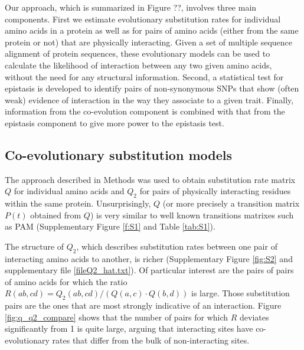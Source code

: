 Our approach, which is summarized in Figure ??, involves three main components. First we estimate evolutionary substitution rates for individual amino acids in a protein as well as for pairs of amino acids (either from the same protein or not) that are physically interacting. Given a set of multiple sequence alignment of protein sequences, these evolutionary models can be used to calculate the likelihood of interaction between any two given amino acids, without the need for any structural information. Second, a statistical test for epistasis is developed to identify pairs of non-synonymous SNPs that show (often weak) evidence of interaction in the way they associate to a given trait. Finally, information from the co-evolution component is combined with that from the epistasis component to give more power to the epistasis test.
 
\subsection{Co-evolutionary substitution models}

The approach described in Methods was used to obtain substitution rate matrix $Q$ for individual amino acids and $Q_2$ for pairs of physically interacting residues within the same protein. Unsurprisingly, $Q$ (or more precisely a transition matrix $P(t)$ obtained from $Q$) is very similar to well known transitions matrixes such as PAM \cite{dayhoff1978model} (Supplementary Figure \ref{f:S1} and Table \ref{tab:S1}).


The structure of $Q_2$, which describes substitution rates between one pair of interacting amino acids to another, is richer (Supplementary Figure \ref{fig:S2} and supplementary file \ref{fileQ2_hat.txt}). Of particular interest are the pairs of pairs of amino acids for which the ratio $R(ab,cd) = Q_2 (ab, cd) / ( Q(a,c) \cdot Q(b,d) )$ is large. Those substitution pairs are the ones that are most strongly indicative of an interaction. Figure \ref{fig:q_q2_compare} shows that the number of pairs for which $R$ deviates significantly from 1 is quite large, arguing that interacting sites have co-evolutionary rates that differ from the bulk of non-interacting sites.

